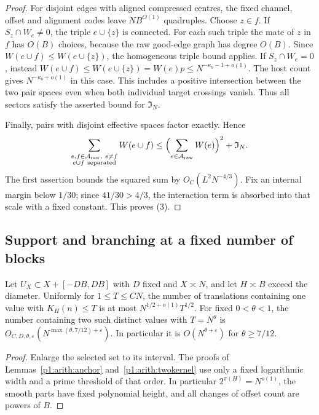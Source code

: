 \begin{proof}
For disjoint edges with aligned compressed centres, the fixed channel,
offset and alignment codes leave $NB^{O(1)}$ quadruples. Choose $z\in f$.
If $S_z\cap W_e\ne0$, the triple $e\cup\{z\}$ is connected.
For each such triple the mate of $z$ in $f$ has $O(B)$ choices,
because the raw good-edge graph has degree $O(B)$. Since
$W(e\cup f)\le W(e\cup\{z\})$, the homogeneous triple bound applies.
If $S_z\cap W_e=0$, instead
$W(e\cup f)\le W(e\cup\{z\})=W(e)p\le N^{-\kappa_b-1+o(1)}$.
The host count gives $N^{-\kappa_b+o(1)}$ in this case.
This includes a positive intersection between the two pair spaces
even when both individual target crossings vanish.
Thus all sectors satisfy the asserted bound for $\mathfrak I_N$.

Finally, pairs with disjoint effective spaces factor exactly. Hence
\[
 \sum_{\substack{e,f\in\mathcal A_{\rm raw},\ e\ne f\\e\cup f\ {\rm separated}}}
       W(e\cup f)
 \le \Bigl(\sum_{e\in\mathcal A_{\rm raw}}W(e)\Bigr)^2+\mathfrak I_N.
\]
The first assertion bounds the squared sum by $O_C(L^2N^{-4/3})$.
Fix an internal margin below $1/30$; since $41/30>4/3$,
the interaction term is absorbed into that scale with a fixed
constant. This proves (3).
\end{proof}

\subsection{Support and branching at a fixed number of blocks}

\begin{lemma}
\label{p1:arith:small-kernels}
Let $U_X\subset X+[-DB,DB]$ with $D$ fixed and $X\asymp N$, and let
$H\asymp B$ exceed the diameter.  Uniformly for $1\leq T\leq CN$,
the number of translations containing one value with $K_H(n)\leq T$
is at most $N^{1/2+o(1)}T^{1/2}$.  For fixed $0<\theta<1$, the number
containing two such distinct values with $T=N^\theta$ is
$O_{C,D,\theta,\varepsilon}(N^{\max(\theta,7/12)+\varepsilon})$.
In particular it is $O(N^{\theta+\varepsilon})$ for $\theta\geq7/12$.
\end{lemma}

\begin{proof}
Enlarge the selected set to its interval.  The proofs of
Lemmas~\ref{p1:arith:anchor} and~\ref{p1:arith:twokernel} use only a
fixed logarithmic width and a prime threshold of that order.  In particular
$2^{\pi(H)}=N^{o(1)}$, the smooth parts have fixed polynomial height,
and all changes of offset count are powers of $B$.
\end{proof}


